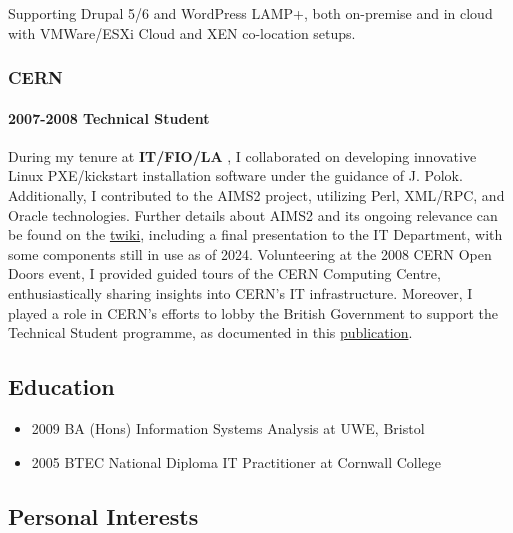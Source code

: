 \documentclass[
]{article}
\providecommand{\tightlist}{%
  \setlength{\itemsep}{0pt}\setlength{\parskip}{0pt}}
\begin{document}
Supporting Drupal 5/6 and WordPress LAMP+, both on-premise and in cloud
with VMWare/ESXi Cloud and XEN co-location setups.

\hypertarget{material-atom-cern}{%
\subsubsection{\texorpdfstring{\faAtom
CERN}{ CERN}}\label{material-atom-cern}}

\hypertarget{technical-student}{%
\paragraph{2007-2008 Technical Student}\label{technical-student}}

During my tenure at \textbf{IT/FIO/LA} \faLinux , I collaborated on
developing innovative Linux PXE/kickstart installation software under
the guidance of J. Polok. Additionally, I contributed to the AIMS2
project, utilizing \faCode Perl, XML/RPC, and Oracle technologies.
Further details about AIMS2 and its ongoing relevance can be found on
the
\href{https://twiki.cern.ch/twiki/bin/view/LinuxSupport/Aims2}{twiki},
including a final presentation to the IT Department, with some
components still in use as of 2024. Volunteering at the 2008 CERN Open
Doors event, I provided guided tours of the CERN Computing Centre,
enthusiastically sharing insights into CERN's IT infrastructure.
Moreover, I played a role in CERN's efforts to lobby the British
Government to support the Technical Student programme, as documented in
this \href{https://cds.cern.ch/record/1120956?ln=en}{publication}.

\hypertarget{material-school-education}{%
\subsection{\texorpdfstring{\faSchool
Education}{ Education}}\label{material-school-education}}

\begin{itemize}
\tightlist
\item
  2009 BA (Hons) Information Systems Analysis at UWE, Bristol
\item
  2005 BTEC National Diploma IT Practitioner at Cornwall College
\end{itemize}

\hypertarget{material-gamepad-personal-interests}{%
\subsection{\texorpdfstring{\faGamepad Personal
Interests}{ Personal Interests}}\label{material-gamepad-personal-interests}}
\end{document}
